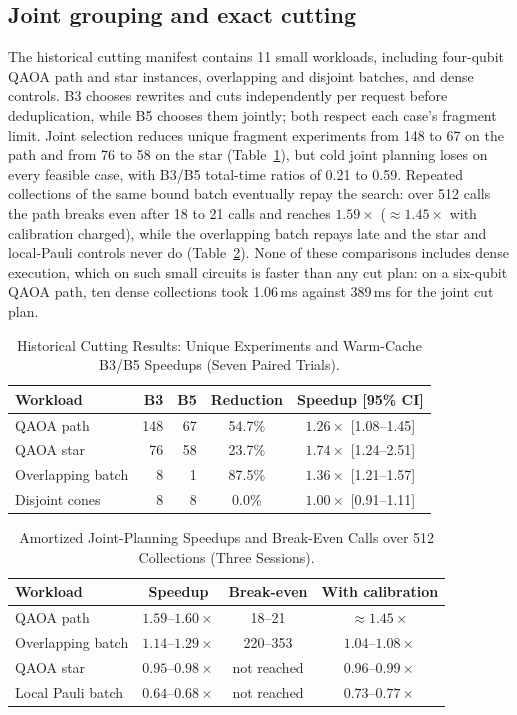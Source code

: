 \subsection{Joint grouping and exact cutting}
The historical cutting manifest contains 11 small workloads, including four-qubit QAOA path and star instances, overlapping and disjoint batches, and dense controls. B3 chooses rewrites and cuts independently per request before deduplication, while B5 chooses them jointly; both respect each case's fragment limit. Joint selection reduces unique fragment experiments from 148 to 67 on the path and from 76 to 58 on the star (Table~\ref{tab:cutting_results}), but cold joint planning loses on every feasible case, with B3/B5 total-time ratios of 0.21 to 0.59. Repeated collections of the same bound batch eventually repay the search: over 512 calls the path breaks even after 18 to 21 calls and reaches $1.59\times$ ($\approx1.45\times$ with calibration charged), while the overlapping batch repays late and the star and local-Pauli controls never do (Table~\ref{tab:cache_results}). None of these comparisons includes dense execution, which on such small circuits is faster than any cut plan: on a six-qubit QAOA path, ten dense collections took 1.06\,ms against 389\,ms for the joint cut plan.

\begin{table}[!t]
\caption{Historical Cutting Results: Unique Experiments and Warm-Cache B3/B5 Speedups (Seven Paired Trials).}
\label{tab:cutting_results}
\centering
\setlength{\tabcolsep}{3pt}
\footnotesize
\begin{tabular}{lrrcc}
\toprule
Workload & B3 & B5 & Reduction & Speedup [95\% CI]\\
\midrule
QAOA path & 148 & 67 & 54.7\% & $1.26\times$ [1.08--1.45]\\
QAOA star & 76 & 58 & 23.7\% & $1.74\times$ [1.24--2.51]\\
Overlapping batch & 8 & 1 & 87.5\% & $1.36\times$ [1.21--1.57]\\
Disjoint cones & 8 & 8 & 0.0\% & $1.00\times$ [0.91--1.11]\\
\bottomrule
\end{tabular}
\end{table}

\begin{table}[!t]
\caption{Amortized Joint-Planning Speedups and Break-Even Calls over 512 Collections (Three Sessions).}
\label{tab:cache_results}
\centering
\setlength{\tabcolsep}{3pt}
\footnotesize
\begin{tabular}{lccc}
\toprule
Workload & Speedup & Break-even & With calibration\\
\midrule
QAOA path & $1.59$--$1.60\times$ & 18--21 & $\approx1.45\times$\\
Overlapping batch & $1.14$--$1.29\times$ & 220--353 & $1.04$--$1.08\times$\\
QAOA star & $0.95$--$0.98\times$ & not reached & $0.96$--$0.99\times$\\
Local Pauli batch & $0.64$--$0.68\times$ & not reached & $0.73$--$0.77\times$\\
\bottomrule
\end{tabular}
\end{table}

